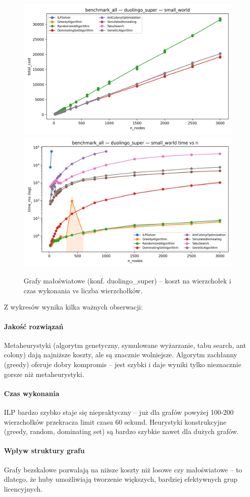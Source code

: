 \begin{figure}[H]
  \centering
  \includegraphics[width=0.48\linewidth]{assets/figures/ba_small_world_duo_cost_vs_n.png}
  \includegraphics[width=0.48\linewidth]{assets/figures/ba_small_world_duo_time_vs_n.png}
  \caption{Grafy małoświatowe (konf. duolingo\_super) -- koszt na wierzchołek i czas wykonania vs liczba wierzchołków.}
  \label{fig:small_world_performance}
\end{figure}

Z wykresów wynika kilka ważnych obserwacji:

\paragraph{Jakość rozwiązań}
Metaheurystyki (algorytm genetyczny, symulowane wyżarzanie, tabu search, ant colony) dają najniższe koszty, ale są znacznie wolniejsze. Algorytm zachłanny (greedy) oferuje dobry kompromis -- jest szybki i daje wyniki tylko nieznacznie gorsze niż metaheurystyki.

\paragraph{Czas wykonania}
ILP bardzo szybko staje się niepraktyczny -- już dla grafów powyżej 100-200 wierzchołków przekracza limit czasu 60 sekund. Heurystyki konstrukcyjne (greedy, random, dominating set) są bardzo szybkie nawet dla dużych grafów.

\paragraph{Wpływ struktury grafu}
Grafy bezskalowe pozwalają na niższe koszty niż losowe czy małoświatowe -- to dlatego, że huby umożliwiają tworzenie większych, bardziej efektywnych grup licencyjnych.


